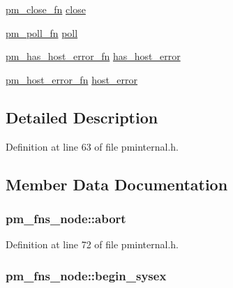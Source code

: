 \begin{DoxyCompactItemize}
\item 
\hyperlink{pminternal_8h_a75f26c4833f753c3cd1129c8d27e2d7b}{pm\+\_\+close\+\_\+fn} \hyperlink{structpm__fns__node_a57b587fb7c65dfa19368b48f6a1a1c2a}{close}
\item 
\hyperlink{pminternal_8h_a5781c403b3991ebb3e4e4ea896c4fcec}{pm\+\_\+poll\+\_\+fn} \hyperlink{structpm__fns__node_a182a3f95a854ae3e4f89864a0476f90b}{poll}
\item 
\hyperlink{pminternal_8h_a910e69310618400e71d581f0865194f2}{pm\+\_\+has\+\_\+host\+\_\+error\+\_\+fn} \hyperlink{structpm__fns__node_a06e0f8783e9b2809d2c0df54c003834b}{has\+\_\+host\+\_\+error}
\item 
\hyperlink{pminternal_8h_a9c36180379b92d20beae06288900a1fd}{pm\+\_\+host\+\_\+error\+\_\+fn} \hyperlink{structpm__fns__node_aa85a8201a70439167b4df4dc4c82abf6}{host\+\_\+error}
\end{DoxyCompactItemize}


\subsection{Detailed Description}


Definition at line 63 of file pminternal.\+h.



\subsection{Member Data Documentation}
\subsubsection[{\texorpdfstring{abort}{abort}}]{ pm\+\_\+fns\+\_\+node\+::abort}\hypertarget{structpm__fns__node_ae0ce4cd25fc61fc3ccb1a56995abe625}{}\label{structpm__fns__node_ae0ce4cd25fc61fc3ccb1a56995abe625}


Definition at line 72 of file pminternal.\+h.

\subsubsection[{\texorpdfstring{begin\+\_\+sysex}{begin_sysex}}]{ pm\+\_\+fns\+\_\+node\+::begin\+\_\+sysex}\hypertarget{structpm__fns__node_a7374e2a3111143034266df5025dbd55d}{}\label{structpm__fns__node_a7374e2a3111143034266df5025dbd55d}


